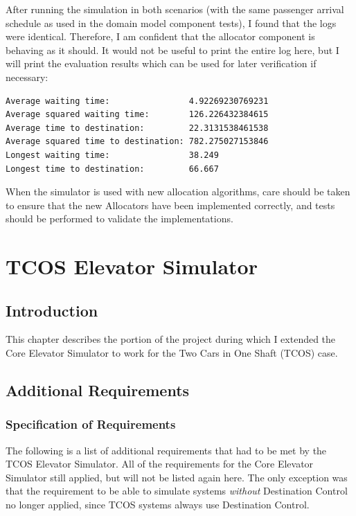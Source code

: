 \documentclass{UoYCSproject}
\begin{document}
After running the simulation in both scenarios (with the same passenger arrival schedule as used in the domain model component tests), I found that the logs were identical.  Therefore, I am confident that the allocator component is behaving as it should.  It would not be useful to print the entire log here, but I will print the evaluation results which can be used for later verification if necessary:

\begin{lstlisting}
Average waiting time:                4.92269230769231
Average squared waiting time:        126.226432384615
Average time to destination:         22.3131538461538
Average squared time to destination: 782.275027153846
Longest waiting time:                38.249
Longest time to destination:         66.667
\end{lstlisting}

When the simulator is used with new allocation algorithms, care should be taken to ensure that the new Allocators have been implemented correctly, and tests should be performed to validate the implementations.

\chapter{TCOS Elevator Simulator}
\label{teschapter}

\section{Introduction}

This chapter describes the portion of the project during which I extended the Core Elevator Simulator to work for the Two Cars in One Shaft (TCOS) case.

\section{Additional Requirements}

\subsection{Specification of Requirements}

The following is a list of additional requirements that had to be met by the TCOS Elevator Simulator.  All of the requirements for the Core Elevator Simulator still applied, but will not be listed again here.  The only exception was that the requirement to be able to simulate systems \textit{without} Destination Control no longer applied, since TCOS systems always use Destination Control.
\end{document}
